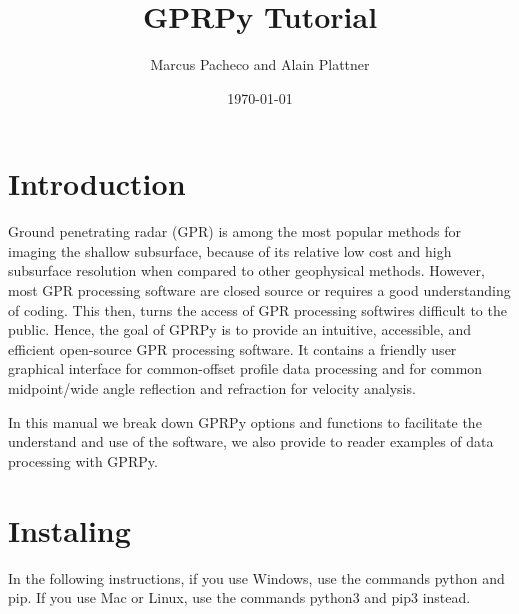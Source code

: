 \documentclass[12pt]{article}
\title{GPRPy Tutorial}
\author{Marcus Pacheco and Alain Plattner}
\date{\today}
\begin{document}
\maketitle
\tableofcontents

\section{Introduction}\label{Introduction}

	Ground penetrating radar (GPR) is among the most popular methods for imaging the shallow subsurface, because of its relative low cost and high subsurface resolution when compared to other geophysical methods. However, most GPR processing software are closed source or requires a good understanding of coding. This then, turns the access of GPR processing softwires difficult to the public. Hence, the goal of GPRPy is to provide an intuitive, accessible, and efficient open-source GPR processing software. It contains a friendly user graphical interface for common-offset profile data processing and for common midpoint/wide angle reflection and refraction for velocity analysis.
	
	In this manual we break down GPRPy options and functions to facilitate the understand and use of the software, we also provide to reader examples of data processing with GPRPy.



\section{Instaling}\label{Instaling}

In the following instructions, if you use Windows, use the commands python and pip. If you use Mac or Linux, use the commands python3 and pip3 instead.
\end{document}
